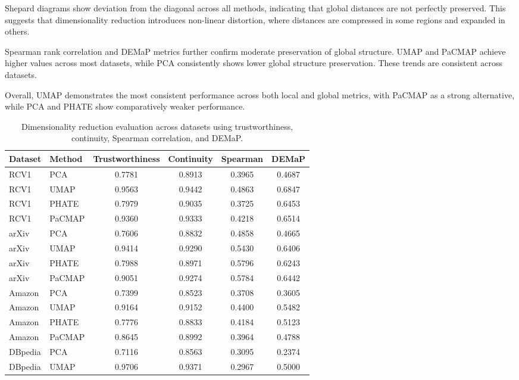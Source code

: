 Shepard diagrams show deviation from the diagonal across all methods, indicating that global distances are not perfectly preserved. This suggests that dimensionality reduction introduces non-linear distortion, where distances are compressed in some regions and expanded in others.

Spearman rank correlation and DEMaP metrics further confirm moderate preservation of global structure. UMAP and PaCMAP achieve higher values across most datasets, while PCA consistently shows lower global structure preservation. These trends are consistent across datasets.

Overall, UMAP demonstrates the most consistent performance across both local and global metrics, with PaCMAP as a strong alternative, while PCA and PHATE show comparatively weaker performance.
\begin{table}[t]
    \centering
    \caption{Dimensionality reduction evaluation across datasets using trustworthiness, continuity, Spearman correlation, and DEMaP.}
\label{tab:dr_metrics}
    \begin{tabular}{llcccc}
    \toprule
    Dataset & Method & Trustworthiness & Continuity & Spearman & DEMaP \\
    \midrule
    RCV1 & PCA & 0.7781 & 0.8913 & 0.3965 & 0.4687 \\
    RCV1 & UMAP & 0.9563 & 0.9442 & 0.4863 & 0.6847 \\
    RCV1 & PHATE & 0.7979 & 0.9035 & 0.3725 & 0.6453 \\
    RCV1 & PaCMAP & 0.9360 & 0.9333 & 0.4218 & 0.6514 \\
    \midrule
    arXiv & PCA & 0.7606 & 0.8832 & 0.4858 & 0.4665 \\
    arXiv & UMAP & 0.9414 & 0.9290 & 0.5430 & 0.6406 \\
    arXiv & PHATE & 0.7988 & 0.8971 & 0.5796 & 0.6243 \\
    arXiv & PaCMAP & 0.9051 & 0.9274 & 0.5784 & 0.6442 \\
    \midrule
    Amazon & PCA & 0.7399 & 0.8523 & 0.3708 & 0.3605 \\
    Amazon & UMAP & 0.9164 & 0.9152 & 0.4400 & 0.5482 \\
    Amazon & PHATE & 0.7776 & 0.8833 & 0.4184 & 0.5123 \\
    Amazon & PaCMAP & 0.8645 & 0.8992 & 0.3964 & 0.4788 \\
    \midrule
    DBpedia & PCA & 0.7116 & 0.8563 & 0.3095 & 0.2374 \\
    DBpedia & UMAP & 0.9706 & 0.9371 & 0.2967 & 0.5000 \\

\end{tabular}
\end{table}

